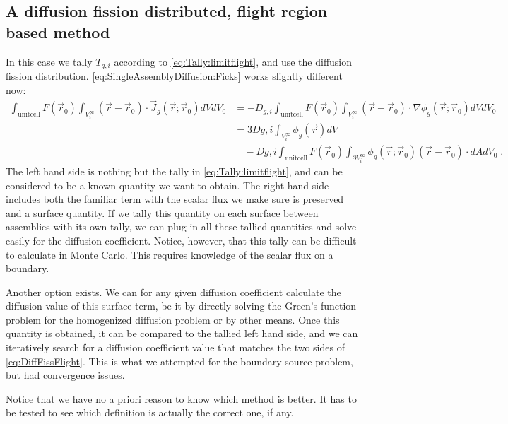 \documentclass[a4paper,letterpaper,12pt,oneside,draft]{article}
\newcommand{\eep}{\;.}
\newcommand{\vr}{\ensuremath{\vec{r}}}
\newcommand{\dvr}{\left(\vr-\vr_0\right)}
\begin{document}
\subsection{A diffusion fission distributed, flight region based method}
In this case we tally $T_{g,i}$ according to \cref{eq:Tally:limitflight}, and use the diffusion fission distribution. \cref{eq:SingleAssemblyDiffusion:Ficks} works slightly different now:
\begin{align}
    \nonumber
    \int_{\text{unitcell}} F(\vr_0)\int_{V_i^\infty} \dvr\cdot\vec{J}_g(\vr;\vr_0) dVdV_0 &= -D_{g,i} \int_{\text{unitcell}} F(\vr_0) \int_{V_i^\infty} \dvr\cdot\nabla \phi_g(\vr;\vr_0)dVdV_0 \\\nonumber
    &= 3D{g,i} \int_{V_i^\infty}\phi_g(\vr)dV \\ 
    \label{eq:DiffFissFlight}
    &\quad -D{g,i}\int_{\text{unitcell}} F(\vr_0) \int_{\partial V_i^\infty}\phi_g(\vr;\vr_0)\dvr\cdot dAdV_0 \eep
\end{align}
The left hand side is nothing but the tally in \cref{eq:Tally:limitflight}, and can be considered to be a known quantity we want to obtain.
The right hand side includes both the familiar term with the scalar flux we make sure is preserved and a surface quantity. 
If we tally this quantity on each surface between assemblies with its own tally, we can plug in all these tallied quantities and solve easily for the diffusion coefficient.
Notice, however, that this tally can be difficult to calculate in Monte Carlo. 
This requires knowledge of the scalar flux on a boundary.

Another option exists. 
We can for any given diffusion coefficient calculate the diffusion value of this surface term, be it by directly solving the Green's function problem for the homogenized diffusion problem or by other means.
Once this quantity is obtained, it can be compared to the tallied left hand side, and we can iteratively search for a diffusion coefficient value that matches the two sides of \cref{eq:DiffFissFlight}.
This is what we attempted for the boundary source problem, but had convergence issues.

Notice that we have no a priori reason to know which method is better.
It has to be tested to see which definition is actually the correct one, if any.
\end{document}

